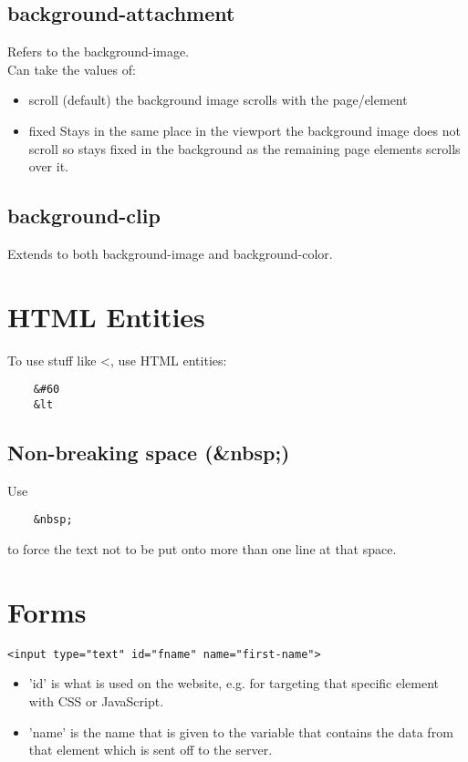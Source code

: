 \documentclass[]{article}
\newcommand{\<}{\guilsinglleft}
\renewcommand{\>}{\guilsinglright}
\begin{document}
\subsection{background-attachment}
Refers to the background-image.
\\
Can take the values of:
\begin{itemize}
	\item scroll (default)
	\subitem the background image scrolls with the page/element
	
	\item fixed
	\subitem Stays in the same place in the viewport 
	\subitem the background image does not scroll so stays fixed in the background as the remaining page elements scrolls over it. 
\end{itemize}

\subsection{background-clip}
Extends to both background-image and background-color.

\section{HTML Entities}
To use stuff like <, use HTML entities:
\begin{lstlisting}
	&#60
	&lt
\end{lstlisting}
\subsection{Non-breaking space (\&nbsp;)}
Use 
\begin{lstlisting}
	&nbsp;
\end{lstlisting}
to force the text not to be put onto more than one line at that space.

\section{Forms}
\begin{lstlisting}
<input type="text" id="fname" name="first-name">
\end{lstlisting}
\begin{itemize}
	\item 'id' is what is used on the website, e.g. for targeting that specific element with CSS or JavaScript.
	\item 'name' is the name that is given to the variable that contains the data from that element which is sent off to the server.
\end{itemize}
\end{document}
